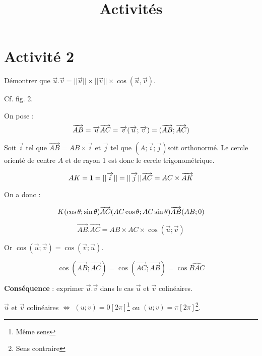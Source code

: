 \documentclass[12pt]{article}
\title{\textbf{Activités}}
\date{}
\begin{document}
\maketitle

\section{}
\section{Activité 2}

Démontrer que $\overrightarrow{u} . \overrightarrow{v} = ||\overrightarrow{u}|| \times ||\overrightarrow{v}|| \times \cos(\overrightarrow{u}, \overrightarrow{v})$.

Cf. fig. 2.

On pose :
\[
\overrightarrow{AB} = \overrightarrow{u}\\
\overrightarrow{AC} = \overrightarrow{v}\\
(\overrightarrow{u};\overrightarrow{v}) = (\overrightarrow{AB};\overrightarrow{AC})
\]

Soit $\overrightarrow{i}$ tel que $\overrightarrow{AB} = AB \times \overrightarrow{i}$ et $\overrightarrow{j}$ tel que $(A;\overrightarrow{i};\overrightarrow{j})$soit orthonormé. Le cercle orienté de centre $A$ et de rayon 1 est donc le cercle trigonométrique.

\[
AK = 1 = ||\overrightarrow{i}|| = ||\overrightarrow{j}||\\
\overrightarrow{AC} = AC \times \overrightarrow{AK}
\]

On a donc :

\[
K(\cos \theta;\sin \theta)\\
\overrightarrow{AC}(AC \cos \theta;AC \sin \theta)\\
\overrightarrow{AB}(AB;0)
\]

\[
\overrightarrow{AB}.\overrightarrow{AC} = AB \times AC \times \cos(\overrightarrow{u};\overrightarrow{v})
\]

Or $\cos(\overrightarrow{u};\overrightarrow{v})=\cos(\overrightarrow{v};\overrightarrow{u})$.

\[
\cos(\overrightarrow{AB};\overrightarrow{AC})=\cos(\overrightarrow{AC};\overrightarrow{AB})=\cos \widehat{BAC}
\]

\textbf{Conséquence} : exprimer $\overrightarrow{u}.\overrightarrow{v}$ dans le cas $\overrightarrow{u}$ et $\overrightarrow{v}$ colinéaires.

$\overrightarrow{u}$ et $\overrightarrow{v}$ colinéaires $\Leftrightarrow$ $(u;v)=0 [2\pi]$\footnote{Même sens} ou $(u;v)=\pi [2\pi]$\footnote{Sens contraire}.
\end{document}
